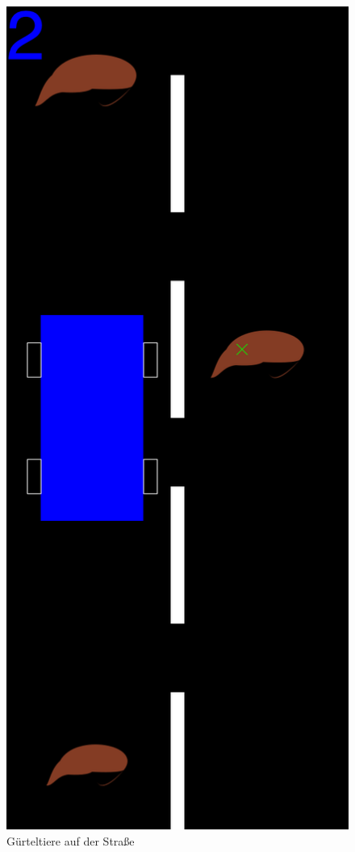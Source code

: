 \begin{figure}[tb]
  \centering
  \includegraphics[height=0.4\textheight]{videospiele/dillo-world}
  \caption{Gürteltiere auf der Straße}
  \label{fig:dillo-world}
\end{figure}

